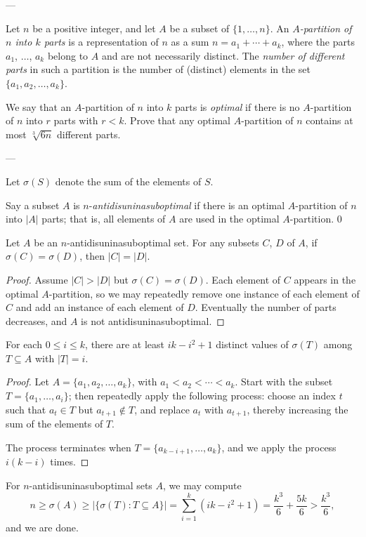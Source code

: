 
---

Let $n$ be a positive integer, and let $A$ be a subset of $\{1,\ldots,n\}$. An \emph{$A$-partition of $n$ into $k$ parts} is a representation of $n$ as a sum $n=a_1+\cdots+a_k$, where the parts $a_1$, $\ldots$, $a_k$ belong to $A$ and are not necessarily distinct. The \emph{number of different parts} in such a partition is the number of (distinct) elements in the set $\{a_1,a_2,\ldots,a_k\}$.

We say that an $A$-partition of $n$ into $k$ parts is \emph{optimal} if there is no $A$-partition of $n$ into $r$ parts with $r<k$. Prove that any optimal $A$-partition of $n$ contains at most $\sqrt[3]{6n}$ different parts.

---

Let $\sigma(S)$ denote the sum of the elements of $S$.

Say a subset $A$ is $n$-\emph{antidisuninasuboptimal} if there is an optimal $A$-partition of $n$ into $|A|$ parts; that is, all elements of $A$ are used in the optimal $A$-partition.
\setcounter{iclaim}0
\begin{iclaim}
    Let $A$ be an $n$-antidisuninasuboptimal set. For any subsets $C$, $D$ of $A$, if $\sigma(C)=\sigma(D)$, then $|C|=|D|$.
\end{iclaim}
\begin{proof}
    Assume $|C|>|D|$ but $\sigma(C)=\sigma(D)$. Each element of $C$ appears in the optimal $A$-partition, so we may repeatedly remove one instance of each element of $C$ and add an instance of each element of $D$. Eventually the number of parts decreases, and $A$ is not antidisuninasuboptimal.
\end{proof}
\begin{iclaim}
    For each $0\le i\le k$, there are at least $ik-i^2+1$ distinct values of $\sigma(T)$ among $T\subseteq A$ with $|T|=i$.
\end{iclaim}
\begin{proof}
    Let $A=\{a_1,a_2,\ldots,a_k\}$, with $a_1<a_2<\cdots<a_k$. Start with the subset $T=\{a_1,\ldots,a_i\}$; then repeatedly apply the following process: choose an index $t$ such that $a_t\in T$ but $a_{t+1}\notin T$, and replace $a_t$ with $a_{t+1}$, thereby increasing the sum of the elements of $T$.

    The process terminates when $T=\{a_{k-i+1},\ldots,a_k\}$, and we apply the process $i(k-i)$ times.
\end{proof}

For $n$-antidisuninasuboptimal sets $A$, we may compute \[n\ge\sigma(A)\ge\left\lvert\{\sigma(T):T\subseteq A\}\right\rvert=\sum_{i=1}^k\left(ik-i^2+1\right)=\frac{k^3}6+\frac{5k}6>\frac{k^3}6,\]
and we are done.

